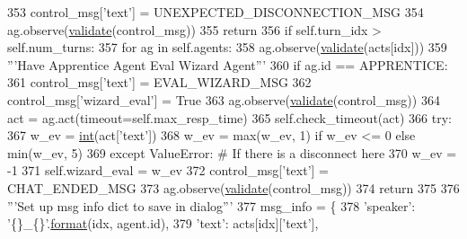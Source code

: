\begin{DoxyCode}
353                         control\_msg[\textcolor{stringliteral}{'text'}] = UNEXPECTED\_DISCONNECTION\_MSG
354                         ag.observe(\hyperlink{namespaceparlai_1_1core_1_1worlds_afc3fad603b7bce41dbdc9cdc04a9c794}{validate}(control\_msg))
355                         \textcolor{keywordflow}{return}
356                 \textcolor{keywordflow}{if} self.turn\_idx > self.num\_turns:
357                     \textcolor{keywordflow}{for} ag \textcolor{keywordflow}{in} self.agents:
358                         ag.observe(\hyperlink{namespaceparlai_1_1core_1_1worlds_afc3fad603b7bce41dbdc9cdc04a9c794}{validate}(acts[idx]))
359                         \textcolor{stringliteral}{'''Have Apprentice Agent Eval Wizard Agent'''}
360                         \textcolor{keywordflow}{if} ag.id == APPRENTICE:
361                             control\_msg[\textcolor{stringliteral}{'text'}] = EVAL\_WIZARD\_MSG
362                             control\_msg[\textcolor{stringliteral}{'wizard\_eval'}] = \textcolor{keyword}{True}
363                             ag.observe(\hyperlink{namespaceparlai_1_1core_1_1worlds_afc3fad603b7bce41dbdc9cdc04a9c794}{validate}(control\_msg))
364                             act = ag.act(timeout=self.max\_resp\_time)
365                             self.check\_timeout(act)
366                             \textcolor{keywordflow}{try}:
367                                 w\_ev = \hyperlink{namespacelanguage__model_1_1eval__ppl_a7d12ee00479673c5c8d1f6d01faa272a}{int}(act[\textcolor{stringliteral}{'text'}])
368                                 w\_ev = max(w\_ev, 1) \textcolor{keywordflow}{if} w\_ev <= 0 \textcolor{keywordflow}{else} min(w\_ev, 5)
369                             \textcolor{keywordflow}{except} ValueError:  \textcolor{comment}{# If there is a disconnect here}
370                                 w\_ev = -1
371                             self.wizard\_eval = w\_ev
372                         control\_msg[\textcolor{stringliteral}{'text'}] = CHAT\_ENDED\_MSG
373                         ag.observe(\hyperlink{namespaceparlai_1_1core_1_1worlds_afc3fad603b7bce41dbdc9cdc04a9c794}{validate}(control\_msg))
374                 \textcolor{keywordflow}{return}
375 
376             \textcolor{stringliteral}{'''Set up msg info dict to save in dialog'''}
377             msg\_info = \{
378                 \textcolor{stringliteral}{'speaker'}: \textcolor{stringliteral}{'\{\}\_\{\}'}.\hyperlink{namespaceparlai_1_1chat__service_1_1services_1_1messenger_1_1shared__utils_a32e2e2022b824fbaf80c747160b52a76}{format}(idx, agent.id),
379                 \textcolor{stringliteral}{'text'}: acts[idx][\textcolor{stringliteral}{'text'}],

\end{DoxyCode}
